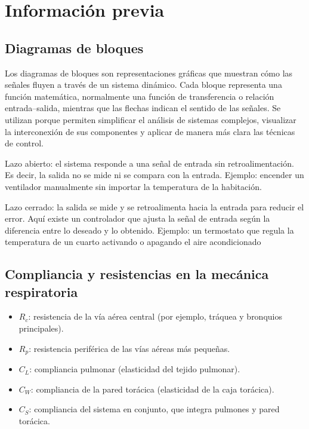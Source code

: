 \documentclass[journal]{IEEEtran}
\begin{document}
\section{Información previa}

\subsection{Diagramas de bloques}
Los diagramas de bloques son representaciones gráficas que muestran cómo las señales fluyen a través de un sistema dinámico. Cada bloque representa una función matemática, normalmente una función de transferencia o relación entrada–salida, mientras que las flechas indican el sentido de las señales. Se utilizan porque permiten simplificar el análisis de sistemas complejos, visualizar la interconexión de sus componentes y aplicar de manera más clara las técnicas de control.

Lazo abierto: el sistema responde a una señal de entrada sin retroalimentación. Es decir, la salida no se mide ni se compara con la entrada. Ejemplo: encender un ventilador manualmente sin importar la temperatura de la habitación.

Lazo cerrado: la salida se mide y se retroalimenta hacia la entrada para reducir el error. Aquí existe un controlador que ajusta la señal de entrada según la diferencia entre lo deseado y lo obtenido. Ejemplo: un termostato que regula la temperatura de un cuarto activando o apagando el aire acondicionado

\subsection{Compliancia y resistencias en la mecánica respiratoria}



\begin{itemize}
    \item $R_c$: resistencia de la vía aérea central (por ejemplo, tráquea y bronquios principales).
    \item $R_p$: resistencia periférica de las vías aéreas más pequeñas.
    \item $C_L$: compliancia pulmonar (elasticidad del tejido pulmonar).
    \item $C_W$: compliancia de la pared torácica (elasticidad de la caja torácica).
    \item $C_S$: compliancia del sistema en conjunto, que integra pulmones y pared torácica.
\end{itemize}
\end{document}
